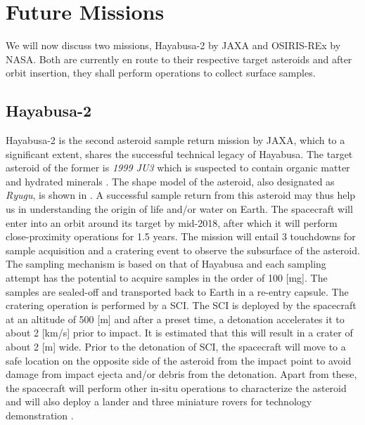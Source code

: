 \section{Future Missions}
\label{sec:future_missions}
We will now discuss two missions, Hayabusa-2 by \gls{JAXA} and \gls{OSIRIS-REx} by \gls{NASA}. Both are currently en route to their respective target asteroids and after orbit insertion, they shall perform operations to collect surface samples.

\subsection{Hayabusa-2}
\label{subsec:hayabusa2_heritage}
Hayabusa-2 is the second asteroid sample return mission by \gls{JAXA}, which to a significant extent, shares the successful technical legacy of Hayabusa. The target asteroid of the former is \textit{1999 JU3} which is suspected to contain organic matter and hydrated minerals \parencite{TsudaHayabusa2SystemDesign}. The shape model of the asteroid, also designated as \textit{Ryugu}, is shown in  \parencite{ryuguShapeModel}. A successful sample return from this asteroid may thus help us in understanding the origin of life and/or water on Earth. The spacecraft will enter into an orbit around its target by mid-2018, after which it will perform close-proximity operations for 1.5 years. The mission will entail 3 touchdowns for sample acquisition and a cratering event to observe the subsurface of the asteroid. The sampling mechanism is based on that of Hayabusa and each sampling attempt has the potential to acquire samples in the order of 100 [mg]. The samples are sealed-off and transported back to Earth in a re-entry capsule. The cratering operation is performed by a \gls{SCI}. The \gls{SCI} is deployed by the spacecraft at an altitude of 500 [m] and after a preset time, a detonation accelerates it to about 2 [km/s] prior to impact. It is estimated that this will result in a crater of about 2 [m] wide. Prior to the detonation of \gls{SCI}, the spacecraft will move to a safe location on the opposite side of the asteroid from the impact point to avoid damage from impact ejecta and/or debris from the detonation. Apart from these, the spacecraft will perform other in-situ operations to characterize the asteroid and will also deploy a lander and three miniature rovers for technology demonstration \parencite{TsudaHayabusa2SystemDesign}.
